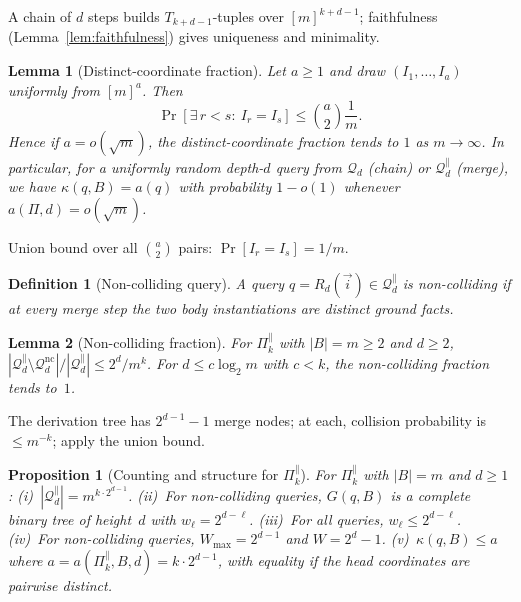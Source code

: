 \documentclass[journal]{IEEEtran}
\makeatletter
\newtheorem{lemma}{Lemma}[section]
\newtheorem{proposition}{Proposition}[section]
\newtheorem{definition}{Definition}[section]
\numberwithin{equation}{section}
\renewenvironment{proof}[1][\proofname]{\par
  \pushQED{\qed}%
  \normalfont \topsep6\p@\@plus6\p@\relax
  \trivlist
  \item[\hskip\labelsep
        \itshape
    #1\@addpunct{.}]\ignorespaces
}{%
  \popQED\endtrivlist\@endpefalse
}
\makeatother
\begin{document}
\begin{proof}
A chain of $d$ steps builds $T_{k+d-1}$-tuples over
$[m]^{k+d-1}$; faithfulness
(Lemma~\ref{lem:faithfulness}) gives uniqueness and
minimality.
\end{proof}

\begin{lemma}[Distinct-coordinate fraction]
\label{lem:distinct-coordinates}
Let \(a\ge 1\) and draw \((I_1,\ldots,I_a)\) uniformly from \([m]^a\).
Then
\[
  \Pr[\exists\,r<s:\ I_r=I_s]\le \binom{a}{2}\frac{1}{m}.
\]
Hence if \(a=o(\sqrt m)\), the distinct-coordinate fraction tends to \(1\) as
\(m\to\infty\). In particular, for a uniformly random depth-\(d\) query from
\(\mathcal Q_d\) (chain) or \(\mathcal Q_d^{\parallel}\) (merge), we have
\(\kappa(q,B)=a(q)\) with probability \(1-o(1)\) whenever \(a(\Pi,d)=o(\sqrt m)\).
\end{lemma}

\begin{proof}
Union bound over all \(\binom{a}{2}\) pairs: \(\Pr[I_r=I_s]=1/m\).
\end{proof}

\begin{definition}[Non-colliding query]
\label{def:non-colliding}
A query $q=R_d(\vec i)\in\mathcal{Q}_d^{\parallel}$ is
\emph{non-colliding} if at every merge step the two body
instantiations are distinct ground facts.
\end{definition}

\begin{lemma}[Non-colliding fraction]
\label{lem:non-colliding-fraction}
For $\Pi_k^{\parallel}$ with $|B|=m\ge 2$ and $d\ge 2$,
$|\mathcal{Q}_d^{\parallel}\setminus
\mathcal{Q}_d^{\mathrm{nc}}|
/|\mathcal{Q}_d^{\parallel}|\le 2^d/m^k$.
For $d\le c\log_2 m$ with $c<k$, the non-colliding fraction
tends to~$1$.
\end{lemma}

\begin{proof}
The derivation tree has $2^{d-1}-1$ merge nodes; at each,
collision probability is $\le m^{-k}$; apply the union
bound.
\end{proof}

\begin{proposition}[Counting and structure for
  $\Pi_k^{\parallel}$]
\label{prop:merge-counting}
For $\Pi_k^{\parallel}$ with $|B|=m$ and $d\ge 1$:
\textup{(i)}~$|\mathcal{Q}_d^{\parallel}|
=m^{k\cdot 2^{d-1}}$.
\textup{(ii)}~For non-colliding queries, $G(q,B)$ is a
complete binary tree of height~$d$ with
$w_\ell=2^{d-\ell}$.
\textup{(iii)}~For all queries, $w_\ell\le 2^{d-\ell}$.
\textup{(iv)}~For non-colliding queries,
$W_{\max}=2^{d-1}$ and $W=2^d-1$.
\textup{(v)}~\(\kappa(q,B)\le a\) where \(a=a(\Pi_k^{\parallel},B,d)=k\cdot 2^{d-1}\),
with equality if the head coordinates are pairwise distinct.
\end{proposition}
\end{document}
